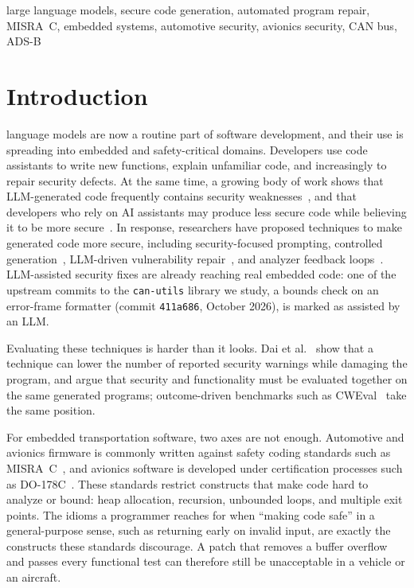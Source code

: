 \documentclass[12pt]{IEEEtran}
\begin{document}
\begin{IEEEkeywords}
large language models, secure code generation, automated program repair, MISRA~C, embedded systems, automotive security, avionics security, CAN bus, ADS-B
\end{IEEEkeywords}

\section{Introduction}
 language models are now a routine part of software development, and their use is spreading into embedded and safety-critical domains. Developers use code assistants to write new functions, explain unfamiliar code, and increasingly to repair security defects. At the same time, a growing body of work shows that LLM-generated code frequently contains security weaknesses~\cite{pearce2022asleep, khoury2023chatgpt, tihanyi2023formai}, and that developers who rely on AI assistants may produce less secure code while believing it to be more secure~\cite{perry2023users}. In response, researchers have proposed techniques to make generated code more secure, including security-focused prompting, controlled generation~\cite{he2023sven}, LLM-driven vulnerability repair~\cite{pearce2023zeroshot}, and analyzer feedback loops~\cite{yan2025guiding}. LLM-assisted security fixes are already reaching real embedded code: one of the upstream commits to the \texttt{can-utils} library we study, a bounds check on an error-frame formatter (commit \texttt{411a686}, October 2026), is marked as assisted by an LLM.

Evaluating these techniques is harder than it looks. Dai et al.~\cite{rethinking2026} show that a technique can lower the number of reported security warnings while damaging the program, and argue that security and functionality must be evaluated together on the same generated programs; outcome-driven benchmarks such as CWEval~\cite{peng2025cweval} take the same position.

For embedded transportation software, two axes are not enough. Automotive and avionics firmware is commonly written against safety coding standards such as MISRA~C~\cite{misra2012}, and avionics software is developed under certification processes such as DO-178C~\cite{do178c}. These standards restrict constructs that make code hard to analyze or bound: heap allocation, recursion, unbounded loops, and multiple exit points. The idioms a programmer reaches for when ``making code safe'' in a general-purpose sense, such as returning early on invalid input, are exactly the constructs these standards discourage. A patch that removes a buffer overflow and passes every functional test can therefore still be unacceptable in a vehicle or an aircraft.
\end{document}
